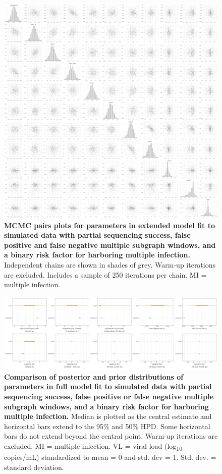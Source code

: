 \documentclass[10pt,letterpaper]{article}
\begin{document}
\begin{figure}[!ht]
 \includegraphics[width=1\textwidth]{../../figures/extended_simulation_extended_pairs.pdf}
\caption{{\bf MCMC pairs plots for parameters in  extended model fit to simulated data with partial sequencing success, false positive and false negative multiple subgraph windows, and a binary risk factor for harboring multiple infection.} Independent chains are shown in shades of grey. Warm-up iterations are excluded. Includes a sample of 250 iterations per chain. MI = multiple infection. }
\end{figure}

\begin{figure}[!ht]
 \includegraphics[width=1\textwidth]{../../figures/extended_simulation_extended_prior.pdf}
\caption{{\bf Comparison of posterior and prior distributions of parameters in full model fit to simulated data with partial sequencing success, false positive or false negative multiple subgraph windows, and a binary risk factor for harboring multiple infection.} Median is plotted as the central estimate and horizontal bars extend to the 95\% and 50\% HPD. Some horizontal bars do not extend beyond the central point. Warm-up iterations are excluded. MI = multiple infection. VL = viral load (log\textsubscript{10} copies/mL) standardized to mean = 0 and std. dev = 1. Std. dev. = standard deviation. }
\end{figure}
\end{document}
